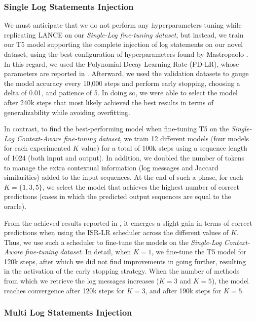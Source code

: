 \subsubsection{Single Log Statements Injection}

We must anticipate that we do not perform any hyperparameters tuning while replicating LANCE on our \textit{Single-Log fine-tuning dataset}, but instead, we train our T5 model supporting the complete injection of log statements on our novel dataset, using the best configuration of hyperparameters found by Mastropaolo \etal \cite{mastropaolo2022using}. In this regard, we used the Polynomial Decay Learning Rate (PD-LR), whose parameters are reported in . Afterward, we used the validation datasets to gauge the model accuracy every 10,000 steps and perform early stopping, choosing a delta of 0.01, and patience of 5. In doing so, we were able to select the model after 240k steps that most likely achieved the best results in terms of generalizability while avoiding overfitting.

In contrast, to find the best-performing model when fine-tuning T5 on the \textit{Single-Log Context-Aware fine-tuning dataset}, we train 12 different models (\ie four models for each experimented $K$ value) for a total of 100k steps using a sequence length of 1024 (both input and output). In addition, we doubled the number of tokens to manage the extra contextual information (\ie log messages and Jaccard similarities) added to the input sequences. At the end of such a phase, for each $K=\{1,3,5\}$, we select the model that achieves the highest number of correct predictions (\ie cases in which the predicted output sequences are equal to the oracle).

From the achieved results reported in , it emerges a slight gain in terms of correct predictions when using the ISR-LR scheduler across the different values of $K$. Thus, we use such a scheduler to fine-tune the models on the	\textit{Single-Log Context-Aware fine-tuning dataset}. In detail, when $K=1$, we fine-tune the T5 model for 120k steps, after which we did not find improvements in going further, resulting in the activation of the early stopping strategy. When the number of methods from which we retrieve the log messages increases (\ie $K=3$ and $K=5$), the model reaches convergence after 120k steps for $K=3$, and after 190k steps for $K=5$.

\subsubsection{Multi Log Statements Injection} \label{sec:multi-injection-model}

